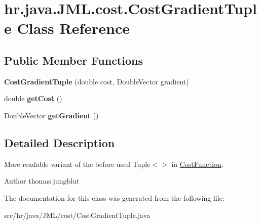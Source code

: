 \hypertarget{classhr_1_1java_1_1_j_m_l_1_1cost_1_1_cost_gradient_tuple}{\section{hr.\+java.\+J\+M\+L.\+cost.\+Cost\+Gradient\+Tuple Class Reference}
\label{classhr_1_1java_1_1_j_m_l_1_1cost_1_1_cost_gradient_tuple}
}
\subsection*{Public Member Functions}
\begin{DoxyCompactItemize}
\item 
\hypertarget{classhr_1_1java_1_1_j_m_l_1_1cost_1_1_cost_gradient_tuple_a06970ea1ada93ebac1abe6ebbde8dfd0}{{\bfseries Cost\+Gradient\+Tuple} (double cost, Double\+Vector gradient)}\label{classhr_1_1java_1_1_j_m_l_1_1cost_1_1_cost_gradient_tuple_a06970ea1ada93ebac1abe6ebbde8dfd0}

\item 
\hypertarget{classhr_1_1java_1_1_j_m_l_1_1cost_1_1_cost_gradient_tuple_aa6342f2d6d3573cbb838b1f49766d18e}{double {\bfseries get\+Cost} ()}\label{classhr_1_1java_1_1_j_m_l_1_1cost_1_1_cost_gradient_tuple_aa6342f2d6d3573cbb838b1f49766d18e}

\item 
\hypertarget{classhr_1_1java_1_1_j_m_l_1_1cost_1_1_cost_gradient_tuple_a22954db9f670eb20c41caaf208d4f627}{Double\+Vector {\bfseries get\+Gradient} ()}\label{classhr_1_1java_1_1_j_m_l_1_1cost_1_1_cost_gradient_tuple_a22954db9f670eb20c41caaf208d4f627}

\end{DoxyCompactItemize}


\subsection{Detailed Description}
More readable variant of the before used Tuple$<$$>$ in \hyperlink{interfacehr_1_1java_1_1_j_m_l_1_1cost_1_1_cost_function}{Cost\+Function}.

\begin{DoxyAuthor}{Author}
thomas.\+jungblut 
\end{DoxyAuthor}


The documentation for this class was generated from the following file\+:\begin{DoxyCompactItemize}
\item 
src/hr/java/\+J\+M\+L/cost/Cost\+Gradient\+Tuple.\+java\end{DoxyCompactItemize}
